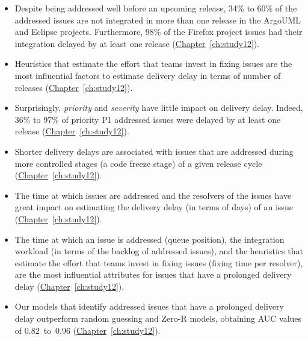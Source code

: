 \begin{itemize}

	\item Despite being addressed well before an upcoming release, 34\% to
		60\% of the addressed issues are not integrated in more than one
		release in the ArgoUML and Eclipse projects. Furthermore, 98\%
		of the Firefox project issues had their integration delayed by
		at least one release
		(\hyperref[ch:study12]{Chapter}~\ref{ch:study12}).

	\item Heuristics that estimate the effort that teams invest in
		fixing issues are the most influential factors to
		estimate delivery delay in terms of number of releases
		(\hyperref[ch:study12]{Chapter}~\ref{ch:study12}).

	\item Surprisingly, \textit{priority} and \textit{severity} have little
		impact on delivery delay. Indeed, 36\% to 97\% of priority P1
		addressed issues were delayed by at least one release
		(\hyperref[ch:study12]{Chapter}~\ref{ch:study12}).

	\item Shorter delivery delays are associated with issues that are
		addressed during more controlled stages (\eg a code freeze
		stage) of a given release cycle
		(\hyperref[ch:study12]{Chapter}~\ref{ch:study12}).

	\item The time at which issues are addressed and the resolvers
		of the issues have great impact on estimating the
		delivery delay (in terms of days) of an issue
		(\hyperref[ch:study12]{Chapter}~\ref{ch:study12}).

	\item The time at which an issue is addressed (queue position), the
		integration workload (in terms of the backlog of addressed
		issues), and the heuristics that estimate the effort that teams
		invest in fixing issues (fixing time per resolver), are the most
		influential attributes for issues that have a prolonged delivery
		delay (\hyperref[ch:study12]{Chapter}~\ref{ch:study12}). 

	\item Our models that identify addressed issues that have a prolonged
		delivery delay outperform random guessing and Zero-R models,
		obtaining AUC values of 0.82~to~0.96
		(\hyperref[ch:study12]{Chapter}~\ref{ch:study12}).

\end{itemize}

